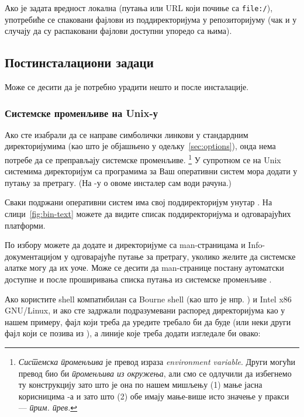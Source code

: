 \documentclass{article}
\begin{document}
Ако је задата вредност локална (путања или URL који почиње са
\texttt{file:/}), употребиће се спаковани фајлови из поддиректоријума
 у репозиторијуму (чак и у случају да су распаковани
фајлови доступни упоредо са њима).


\subsection{Постинсталациони задаци}
\label{sec:postinstall}

Може се десити да је потребно урадити нешто и после инсталације.


\subsubsection{Системске променљиве на Unix-у}
\label{sec:env}

Ако сте изабрали да се направе симболички линкови у стандардним
директоријумима (као што је објашњено у одељку~\ref{sec:options}),
онда нема потребе да се преправљају системске променљиве.%
\footnote{\textserbian{\emph{Системска променљива} је
превод израза \textenglish{\emph{environment variable}}. Други могући
превод био би \emph{променљива из окружења}, али смо се одлучили да
избегнемо ту конструкцију зато што је она по нашем мишљењу (1) мање
јасна корисницима \Windows{}-а и зато што (2) обе имају мање-више
исто значење у пракси --- \emph{прим. прев.}}} У супротном се на Unix
системима директоријум са програмима за Ваш оперативни систем мора
додати у путању за претрагу. (На \Windows-у о овоме инсталер сам води
рачуна.)

Сваки подржани оперативни систем има свој поддиректоријум унутар
. На слици~\ref{fig:bin-text} можете да видите
списак поддиректоријума и одговарајућих платформи.

По избору можете да додате и директоријуме са man-страницама и
Info-документацијом у одговарајуће путање за претрагу, уколико желите
да системске алатке могу да их уоче. Може се десити да man-странице
постану аутоматски доступне и после проширивања списка путања из
системске променљиве .

Ако користите shell компатибилан са Bourne shell (као што је нпр.
) и Intel x86 GNU/Linux, и ако сте задржали подразумевани
распоред директоријума као у нашем примеру, фајл који треба да
уредите требало би да буде  (или неки други
фајл који се позива из ), а линије које треба
додати изгледале би овако:
\end{document}
